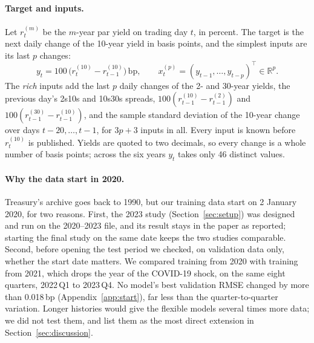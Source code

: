 \documentclass{article}
\newcommand{\bp}{\,\mathrm{bp}}
\newcommand{\gentable}[2][\small]{{#1\setlength{\tabcolsep}{4pt}}}
\begin{document}
\begin{table}[t]
  \caption{Observations by year and the RMSE of the zero-change forecast, which equals the root mean square of the daily change and measures how volatile each year was. The first change of 2020 has no predecessor; later years difference against the previous year's last quote. The last two columns give each year's role in the two studies of Section~\ref{sec:setup}.}
  \label{tab:data}
  \centering
  \gentable{tab_data}
\end{table}

\paragraph{Target and inputs.} Let $r^{(m)}_t$ be the $m$-year par yield on trading day $t$, in percent. The target is the next daily change of the 10-year yield in basis points, and the simplest inputs are its last $p$ changes:
\begin{equation}
  y_t = 100\,\big(r^{(10)}_t - r^{(10)}_{t-1}\big) \bp, \qquad x_t^{(p)} = (y_{t-1}, \ldots, y_{t-p})^\top \in \mathbb{R}^p .
  \label{eq:features}
\end{equation}
The \emph{rich} inputs add the last $p$ daily changes of the 2- and 30-year yields, the previous day's 2s10s and 10s30s spreads, $100(r^{(10)}_{t-1} - r^{(2)}_{t-1})$ and $100(r^{(30)}_{t-1} - r^{(10)}_{t-1})$, and the sample standard deviation of the 10-year change over days $t-20, \ldots, t-1$, for $3p+3$ inputs in all. Every input is known before $r^{(10)}_t$ is published. Yields are quoted to two decimals, so every change is a whole number of basis points; across the six years $y_t$ takes only 46 distinct values.

\paragraph{Why the data start in 2020.} Treasury's archive goes back to 1990, but our training data start on 2 January 2020, for two reasons. First, the 2023 study (Section~\ref{sec:setup}) was designed and run on the 2020--2023 file, and its result stays in the paper as reported; starting the final study on the same date keeps the two studies comparable. Second, before opening the test period we checked, on validation data only, whether the start date matters. We compared training from 2020 with training from 2021, which drops the year of the COVID-19 shock, on the same eight quarters, 2022\,Q1 to 2023\,Q4. No model's best validation RMSE changed by more than 0.018\,bp (Appendix~\ref{app:start}), far less than the quarter-to-quarter variation. Longer histories would give the flexible models several times more data; we did not test them, and list them as the most direct extension in Section~\ref{sec:discussion}.
\end{document}
